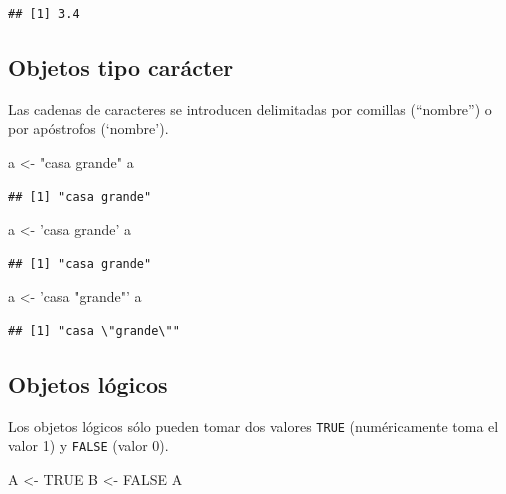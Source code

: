 \documentclass[]{book}
\newenvironment{Shaded}{\begin{snugshade}}{\end{snugshade}}
\newcommand{\StringTok}[1]{\textcolor[rgb]{0.31,0.60,0.02}{#1}}
\newcommand{\OtherTok}[1]{\textcolor[rgb]{0.56,0.35,0.01}{#1}}
\newcommand{\NormalTok}[1]{#1}
\begin{document}
\begin{verbatim}
## [1] 3.4
\end{verbatim}

\subsection{Objetos tipo carácter}\label{objetos-tipo-caracter}

Las cadenas de caracteres se introducen delimitadas por comillas
(``nombre'') o por apóstrofos (`nombre').

\begin{Shaded}
\begin{Highlighting}[]
\NormalTok{a <-}\StringTok{ "casa grande"}
\NormalTok{a}
\end{Highlighting}
\end{Shaded}

\begin{verbatim}
## [1] "casa grande"
\end{verbatim}

\begin{Shaded}
\begin{Highlighting}[]
\NormalTok{a <-}\StringTok{ 'casa grande'}
\NormalTok{a}
\end{Highlighting}
\end{Shaded}

\begin{verbatim}
## [1] "casa grande"
\end{verbatim}

\begin{Shaded}
\begin{Highlighting}[]
\NormalTok{a <-}\StringTok{ 'casa "grande"'}
\NormalTok{a}
\end{Highlighting}
\end{Shaded}

\begin{verbatim}
## [1] "casa \"grande\""
\end{verbatim}

\subsection{Objetos lógicos}\label{objetos-logicos}

Los objetos lógicos sólo pueden tomar dos valores \texttt{TRUE}
(numéricamente toma el valor 1) y \texttt{FALSE} (valor 0).

\begin{Shaded}
\begin{Highlighting}[]
\NormalTok{A <-}\StringTok{ }\OtherTok{TRUE}
\NormalTok{B <-}\StringTok{ }\OtherTok{FALSE}
\NormalTok{A}
\end{Highlighting}
\end{Shaded}
\end{document}
